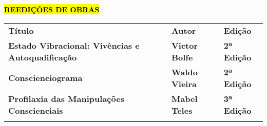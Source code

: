 \textbf{\hl{REEDIÇÕES DE OBRAS}}

\begin{longtable}[]{@{}
  >{\raggedright\arraybackslash}p{}
  >{\raggedright\arraybackslash}p{}
  >{\raggedright\arraybackslash}p{}@{}}
\toprule\noalign{}
\begin{minipage}[b]{\linewidth}\centering
\textbf{Título}
\end{minipage} & \begin{minipage}[b]{\linewidth}\centering
\textbf{Autor}
\end{minipage} & \begin{minipage}[b]{\linewidth}\centering
\textbf{Edição}
\end{minipage} \\
\begin{minipage}[b]{\linewidth}\raggedright
\textbf{Estado Vibracional: Vivências e Autoqualificação}
\end{minipage} & \begin{minipage}[b]{\linewidth}\raggedright
\textbf{Victor Bolfe}
\end{minipage} & \begin{minipage}[b]{\linewidth}\raggedright
\textbf{2ª Edição}
\end{minipage} \\
\begin{minipage}[b]{\linewidth}\raggedright
\textbf{Conscienciograma}
\end{minipage} & \begin{minipage}[b]{\linewidth}\raggedright
\textbf{Waldo Vieira}
\end{minipage} & \begin{minipage}[b]{\linewidth}\raggedright
\textbf{2ª Edição}
\end{minipage} \\
\begin{minipage}[b]{\linewidth}\raggedright
\textbf{Profilaxia das Manipulações Conscienciais}
\end{minipage} & \begin{minipage}[b]{\linewidth}\raggedright
\textbf{Mabel Teles}
\end{minipage} & \begin{minipage}[b]{\linewidth}\raggedright
\textbf{3ª Edição}
\end{minipage} \\
\begin{minipage}[b]{\linewidth}\raggedright

\end{minipage}
\end{longtable}
